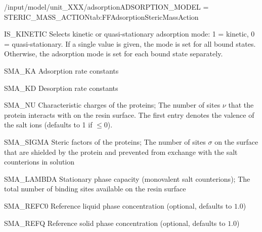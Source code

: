\begin{condsubgroup}{/input/model/unit\_XXX/adsorption}{ADSORPTION\_MODEL = STERIC\_MASS\_ACTION}{tab:FFAdsorptionStericMassAction}
  \begin{dataset}[type=int,range={$\{ 0,1 \}$},length={1 / \texttt{NTOTALBND}}]{IS\_KINETIC}
    Selects kinetic or quasi-stationary adsorption mode: 1 = kinetic, 0 = quasi-stationary.
    If a single value is given, the mode is set for all bound states.
    Otherwise, the adsorption mode is set for each bound state separately.
  \end{dataset}
  \begin{dataset}[unit=\si{\raiseto{3}\metre\of{MP}\per\raiseto{3}\metre\of{SP}\per\second}, type=double,range={$\geq 0$},length={\texttt{NCOMP}}]{SMA\_KA}
    Adsorption rate constants
  \end{dataset}
  \begin{dataset}[unit=\si{\per\second}, type=double,range={$\geq 0$},length={\texttt{NCOMP}}]{SMA\_KD}
    Desorption rate constants
  \end{dataset}
  \begin{dataset}[type=double,range={$\geq 0$},length={\texttt{NCOMP}}]{SMA\_NU}
    Characteristic charges of the proteins; The number of sites $\nu$ that the protein interacts with on the resin surface.
    The first entry denotes the valence of the salt ions (defaults to 1 if $\leq 0$).
  \end{dataset}
  \begin{dataset}[type=double,range={$\geq 0$},length={\texttt{NCOMP}}]{SMA\_SIGMA}
    Steric factors of the proteins; The number of sites $\sigma$ on the surface that are shielded by the protein and prevented from exchange with the salt counterions in solution
  \end{dataset}
  \begin{dataset}[unit=\si{\mol\per\cubic\metre\of{SP}}, type=double,range={$\geq 0$},length={1}]{SMA\_LAMBDA}
    Stationary phase capacity (monovalent salt counterions); The total number of binding sites available on the resin surface 
  \end{dataset}
  \begin{dataset}[unit=\si{\mol\per\raiseto{3}\metre\of{MP}}, type=double,range={$> 0$},length={1}]{SMA\_REFC0}
    Reference liquid phase concentration (optional, defaults to $1.0$)
  \end{dataset}
  \begin{dataset}[unit=\si{\mol\per\raiseto{3}\metre\of{SP}}, type=double,range={$> 0$},length={1}]{SMA\_REFQ}
    Reference solid phase concentration (optional, defaults to $1.0$) 
  \end{dataset}
\end{condsubgroup}

